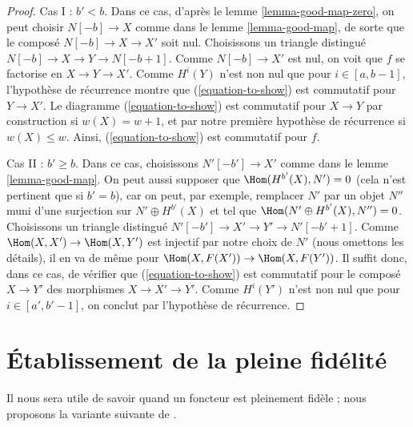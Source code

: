 \begin{proof}
\medskip\noindent
Cas I : $b' < b$. Dans ce cas, d'après le lemme \ref{lemma-good-map-zero},
on peut choisir $N[-b] \to X$ comme dans le lemme \ref{lemma-good-map},
de sorte que le composé $N[-b] \to X \to X'$ soit nul.
Choisissons un triangle distingué $N[-b] \to X \to Y \to N[-b + 1]$. Comme
$N[-b] \to X'$ est nul, on voit que $f$ se factorise
en $X \to Y \to X'$. Comme $H^i(Y)$ n'est non nul que pour $i \in [a, b - 1]$,
l'hypothèse de récurrence montre que (\ref{equation-to-show}) est commutatif pour
$Y \to X'$. Le diagramme (\ref{equation-to-show}) est commutatif pour
$X \to Y$ par construction si $w(X) = w + 1$, et par notre première
hypothèse de récurrence si $w(X) \leq w$.
Ainsi, (\ref{equation-to-show}) est commutatif pour $f$.

\medskip\noindent
Cas II : $b' \geq b$. Dans ce cas, choisissons $N'[-b'] \to X'$
comme dans le lemme \ref{lemma-good-map}.
On peut aussi supposer que $\Hom(H^{b'}(X), N') = 0$ (cela n'est
pertinent que si $b' = b$), car on peut, par exemple,
remplacer $N'$ par un objet $N''$ muni d'une surjection sur $N' \oplus H^{b'}(X)$
et tel que $\Hom(N' \oplus H^{b'}(X), N'') = 0$.
Choisissons un triangle distingué
$N'[-b'] \to X' \to Y' \to N'[-b' + 1]$. Comme
$\Hom(X, X') \to \Hom(X, Y')$ est injectif par notre choix de $N'$
(nous omettons les détails), il en va de même pour
$\Hom(X, F(X')) \to \Hom(X, F(Y'))$.
Il suffit donc, dans ce cas, de vérifier que
(\ref{equation-to-show}) est commutatif pour le composé $X \to Y'$
des morphismes $X \to X' \to Y'$.
Comme $H^i(Y')$ n'est non nul que pour $i \in [a', b' - 1]$,
on conclut par l'hypothèse de récurrence.
\end{proof}










\section{Établissement de la pleine fidélité}
\label{section-get-fully-faithful}

\noindent
Il nous sera utile de savoir quand un foncteur est pleinement fidèle ;
nous proposons la variante suivante de \cite[Lemme 2.15]{Orlov-K3}.

